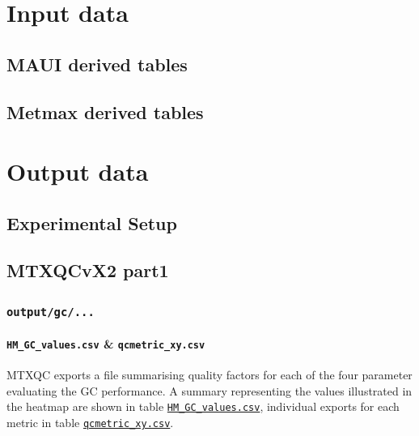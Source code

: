 \documentclass[]{book}
\let\oldparagraph\paragraph
\renewcommand{\paragraph}[1]{\oldparagraph{#1}\mbox{}}
\theoremstyle{definition}
\theoremstyle{definition}
\theoremstyle{definition}
\theoremstyle{remark}
\begin{document}

\section{Input data}\label{input-data}

\subsection{MAUI derived tables}\label{maui-derived-tables}

\subsection{Metmax derived tables}\label{metmax-derived-tables}

\section{Output data}\label{output-data}

\subsection{Experimental Setup}\label{experimental-setup}

\subsection{MTXQCvX2 part1}\label{mtxqcvx2-part1}

\subsubsection{\texorpdfstring{\texttt{output/gc/...}}{output/gc/...}}\label{outputgc...}

\paragraph{\texorpdfstring{\texttt{HM\_GC\_values.csv} \&
\texttt{qcmetric\_xy.csv}}{HM\_GC\_values.csv \& qcmetric\_xy.csv}}\label{hm_gc_values.csv-qcmetric_xy.csv}

MTXQC exports a file summarising quality factors for each of the four
parameter evaluating the GC performance. A summary representing the
values illustrated in the heatmap are shown in table
\href{@ref(tab:o_hm_gc)}{\texttt{HM\_GC\_values.csv}}, individual
exports for each metric in table
\href{@ref(tab:o_gc_metric)}{\texttt{qcmetric\_xy.csv}}.
\end{document}
